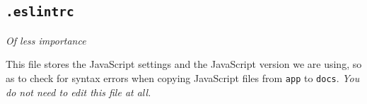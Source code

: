 \subsection{\texttt{.eslintrc}}

\textit{Of less importance}
\vspace{6mm}

This file stores the JavaScript settings and the JavaScript version we are using, so as to check for syntax errors when copying JavaScript files from \texttt{app} to \texttt{docs}. \textit{You do not need to edit this file at all.}
